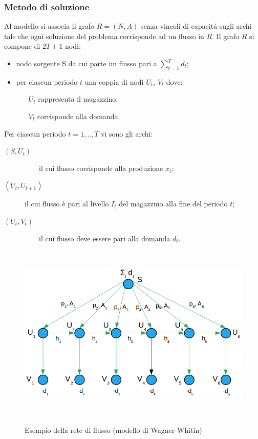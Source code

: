\subsubsection{Metodo di soluzione}
Al modello si associa il grafo $R=(N,A)$ senza vincoli di capacità sugli archi tale che ogni soluzione del problema corrisponde ad un flusso in $R$.\newline
Il grafo $R$ si compone di $2T+1$ nodi:
\begin{itemize}
	\item nodo sorgente S da cui parte un flusso pari a $\sum_{t=1}^{T}d_{t}$;
	\item per ciascun periodo $t$ una coppia di nodi $U_{t}$, $V_{t}$ dove:
	\begin{itemize}
		\item[$U_{t}$] rappresenta il magazzino,
		\item[$V_{t}$] corrisponde alla domanda.
	\end{itemize}
\end{itemize}
Per ciascun periodo $t=1,..,T$ vi sono gli archi:
\begin{description}
	\item[$(S,U_{t})$] ~~~~il cui flusso corrisponde alla produzione $x_{t}$;
	\item[$(U_{t},U_{t+1})$] il cui flusso è pari al livello $I_{t}$ del magazzino alla fine del periodo $t$;
	\item[$(U_{t},V_{t})$] ~~~~il cui flusso deve essere pari alla domanda $d_{t}$.
\end{description}
\newpage
\begin{figure}
	\caption{Esempio della rete di flusso (modello di Wagner-Whitin)}
	\centering
	\includegraphics[height=8.5cm]{images/graph3.png}
	\label{fig:WagnerWhitin}
\end{figure}

